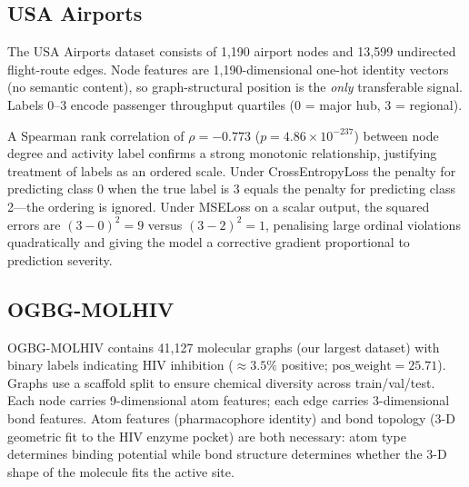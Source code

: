 \documentclass[conference]{IEEEtran}
\begin{document}
\subsection{USA Airports}

The USA Airports dataset \cite{ribeiro2017} consists of 1,190 airport nodes and 13,599 undirected flight-route edges. Node features are 1,190-dimensional one-hot identity vectors (no semantic content), so graph-structural position is the \emph{only} transferable signal. Labels 0--3 encode passenger throughput quartiles (0 = major hub, 3 = regional).

A Spearman rank correlation of $\rho = -0.773$ ($p = 4.86 \times 10^{-237}$) between node degree and activity label confirms a strong monotonic relationship, justifying treatment of labels as an ordered scale. Under CrossEntropyLoss the penalty for predicting class 0 when the true label is 3 equals the penalty for predicting class 2---the ordering is ignored. Under MSELoss on a scalar output, the squared errors are $(3-0)^2 = 9$ versus $(3-2)^2 = 1$, penalising large ordinal violations quadratically and giving the model a corrective gradient proportional to prediction severity.

\subsection{OGBG-MOLHIV}

OGBG-MOLHIV \cite{hu2020} contains 41,127 molecular graphs (our largest dataset) with binary labels indicating HIV inhibition ($\approx 3.5\%$ positive; $\text{pos\_weight} = 25.71$). Graphs use a scaffold split to ensure chemical diversity across train/val/test. Each node carries 9-dimensional atom features; each edge carries 3-dimensional bond features. Atom features (pharmacophore identity) and bond topology (3-D geometric fit to the HIV enzyme pocket) are both necessary: atom type determines binding potential while bond structure determines whether the 3-D shape of the molecule fits the active site.
\end{document}
